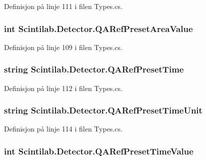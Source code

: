 Definisjon på linje 111 i filen Types.\+cs.

\hypertarget{class_scintilab_1_1_detector_ab82ce8a7a4a8e4e0db88b373242b5363}{
\subsubsection[{Q\+A\+Ref\+Preset\+Area\+Value}]{\setlength{\rightskip}{0pt plus 5cm}int Scintilab.\+Detector.\+Q\+A\+Ref\+Preset\+Area\+Value}}\label{class_scintilab_1_1_detector_ab82ce8a7a4a8e4e0db88b373242b5363}


Definisjon på linje 109 i filen Types.\+cs.

\hypertarget{class_scintilab_1_1_detector_ace8481fd14039fef7f3a57994006d8dd}{
\subsubsection[{Q\+A\+Ref\+Preset\+Time}]{\setlength{\rightskip}{0pt plus 5cm}string Scintilab.\+Detector.\+Q\+A\+Ref\+Preset\+Time}}\label{class_scintilab_1_1_detector_ace8481fd14039fef7f3a57994006d8dd}


Definisjon på linje 112 i filen Types.\+cs.

\hypertarget{class_scintilab_1_1_detector_a18c26c628f016362d684ec53dec7b415}{
\subsubsection[{Q\+A\+Ref\+Preset\+Time\+Unit}]{\setlength{\rightskip}{0pt plus 5cm}string Scintilab.\+Detector.\+Q\+A\+Ref\+Preset\+Time\+Unit}}\label{class_scintilab_1_1_detector_a18c26c628f016362d684ec53dec7b415}


Definisjon på linje 114 i filen Types.\+cs.

\hypertarget{class_scintilab_1_1_detector_a500c172c5f373324cde145a6b80ec565}{
\subsubsection[{Q\+A\+Ref\+Preset\+Time\+Value}]{\setlength{\rightskip}{0pt plus 5cm}int Scintilab.\+Detector.\+Q\+A\+Ref\+Preset\+Time\+Value}}\label{class_scintilab_1_1_detector_a500c172c5f373324cde145a6b80ec565}


